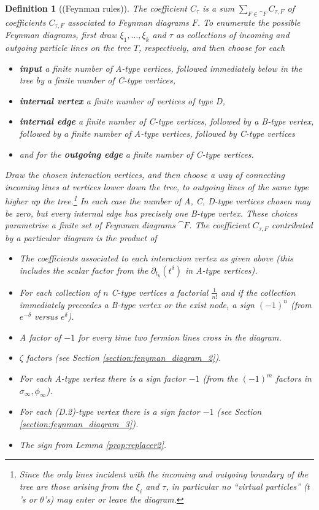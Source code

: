 \documentclass[english,letter paper,12pt,leqno]{article}
\theoremstyle{example}
\newtheorem{definition}[theorem]{Definition}
\numberwithin{equation}{section}
\begin{document}
\begin{definition}[(Feynman rules)]\label{defn:feynman_rules} The coefficient $C_\tau$ is a sum $\sum_{F \in \cat{F}} C_{\tau, F}$ of coefficients $C_{\tau, F}$ associated to Feynman diagrams $F$. To enumerate the possible Feynman diagrams, first draw $\xi_1,\ldots,\xi_k$ and $\tau$ as collections of incoming and outgoing particle lines on the tree $T$, respectively, and then choose for each
\begin{itemize}
\item \textbf{input} a finite number of A-type vertices, followed immediately below in the tree by a finite number of C-type vertices,
\item \textbf{internal vertex} a finite number of vertices of type D,
\item \textbf{internal edge} a finite number of C-type vertices, followed by a B-type vertex, followed by a finite number of A-type vertices, followed by C-type vertices
\item and for the \textbf{outgoing edge} a finite number of C-type vertices.
\end{itemize}
Draw the chosen interaction vertices, and then choose a way of connecting incoming lines at vertices lower down the tree, to outgoing lines of the same type higher up the tree.\footnote{Since the only lines incident with the incoming and outgoing boundary of the tree are those arising from the $\xi_i$ and $\tau$, in particular no ``virtual particles'' ($t$'s or $\theta$'s) may enter or leave the diagram.} In each case the number of A, C, D-type vertices chosen may be zero, but every internal edge has precisely one B-type vertex. These choices parametrise a finite set of Feynman diagrams $\cat{F}$. The coefficient $C_{\tau, F}$ contributed by a particular diagram is the product of
\begin{itemize}
\item The coefficients associated to each interaction vertex as given above (this includes the scalar factor from the $\partial_{t_k}(t^\delta)$ in A-type vertices).
\item For each collection of $n$ C-type vertices a factorial $\frac{1}{n!}$ and if the collection immediately preceedes a B-type vertex or the exist node, a sign $(-1)^n$ (from $e^{-\delta}$ versus $e^\delta$).
\item A factor of $-1$ for every time two fermion lines cross in the diagram.
\item $\zeta$ factors (see Section \ref{section:fenyman_diagram_2}).
\item For each A-type vertex there is a sign factor $-1$ (from the $(-1)^m$ factors in $\sigma_\infty,\phi_\infty$).
\item For each (D.2)-type vertex there is a sign factor $-1$ (see Section \ref{section:feynman_diagram_3}).
\item The sign from Lemma \ref{prop:replacer2}.
\end{itemize}
\end{definition}
\end{document}
